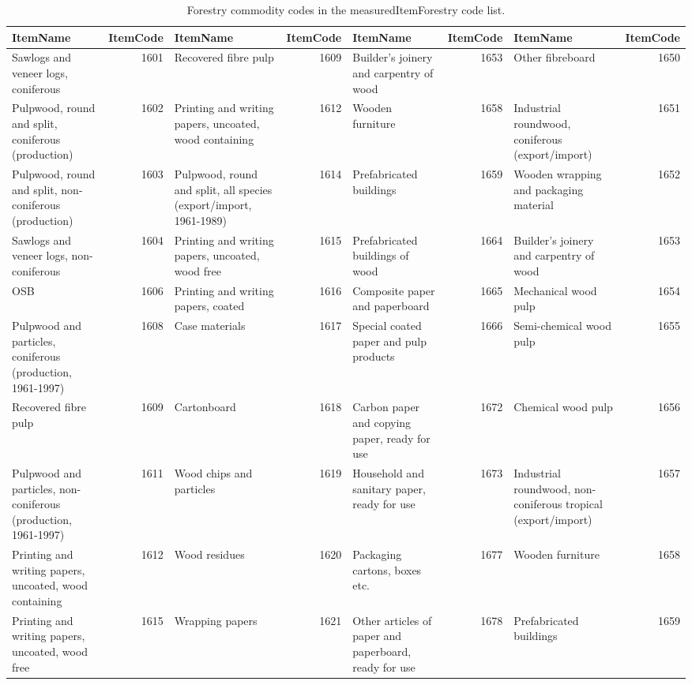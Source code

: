 \documentclass[
]{book}
\begin{document}
\begin{table}

\caption{\label{tab:measuredItemForestry}Forestry commodity codes in the measuredItemForestry code list.}
\centering
\fontsize{12}{14}\selectfont
\begin{tabular}[t]{lrlrlrlr}
\toprule
\rowcolor[HTML]{a9c9a7}  ItemName & ItemCode & ItemName & ItemCode & ItemName & ItemCode & ItemName & ItemCode\\
\midrule
Sawlogs and veneer logs, coniferous & 1601 & Recovered fibre pulp & 1609 & Builder's joinery and carpentry of wood & 1653 & Other fibreboard & 1650\\
Pulpwood, round and split, coniferous (production) & 1602 & Printing and writing papers, uncoated, wood containing & 1612 & Wooden furniture & 1658 & Industrial roundwood, coniferous (export/import) & 1651\\
Pulpwood, round and split, non-coniferous (production) & 1603 & Pulpwood, round and split, all species (export/import, 1961-1989) & 1614 & Prefabricated buildings & 1659 & Wooden wrapping and packaging material & 1652\\
Sawlogs and veneer logs, non-coniferous & 1604 & Printing and writing papers, uncoated, wood free & 1615 & Prefabricated buildings of wood & 1664 & Builder's joinery and carpentry of wood & 1653\\
OSB & 1606 & Printing and writing papers, coated & 1616 & Composite paper and paperboard & 1665 & Mechanical wood pulp & 1654\\
\addlinespace
Pulpwood and particles, coniferous (production, 1961-1997) & 1608 & Case materials & 1617 & Special coated paper and pulp products & 1666 & Semi-chemical wood pulp & 1655\\
Recovered fibre pulp & 1609 & Cartonboard & 1618 & Carbon paper and copying paper, ready for use & 1672 & Chemical wood pulp & 1656\\
Pulpwood and particles, non-coniferous (production, 1961-1997) & 1611 & Wood chips and particles & 1619 & Household and sanitary paper, ready for use & 1673 & Industrial roundwood, non-coniferous tropical (export/import) & 1657\\
Printing and writing papers, uncoated, wood containing & 1612 & Wood residues & 1620 & Packaging cartons, boxes etc. & 1677 & Wooden furniture & 1658\\
Printing and writing papers, uncoated, wood free & 1615 & Wrapping papers & 1621 & Other articles of paper and paperboard, ready for use & 1678 & Prefabricated buildings & 1659\\

\end{tabular}
\end{table}
\end{document}
